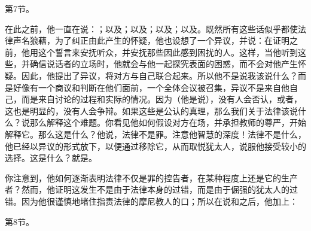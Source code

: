 第7节。\par

在此之前，他一直在说：；以及；以及；以及；以及。既然所有这些话似乎都使法律声名狼藉，为了纠正由此产生的怀疑，他也设想了一个异议，并说：在证明之前，他用这个誓言来安抚听众，并安抚那些因此感到困扰的人。这样，当他听到这些，并确信说话者的立场时，他就会与他一起探究表面的困惑，而不会对他产生怀疑。因此，他提出了异议，将对方与自己联合起来。所以他不是说我该说什么？而是好像有一个商议和判断在他们面前，一个全体会议被召集，异议不是来自他自己，而是来自讨论的过程和实际的情况。因为（他是说），没有人会否认，或者，这也是明显的，没有人会争辩。如果这些是公认的真理，那么我们关于法律该说什么？说那么解释这个难题。你看见他如何假设对方在场，并承担教师的尊严，开始解释它。那么这是什么？他说，法律不是罪。注意他智慧的深度！法律不是什么，他已经以异议的形式放下，以便通过移除它，从而取悦犹太人，说服他接受较小的选择。这是什么？就是。\par

你注意到，他如何逐渐表明法律不仅是罪的控告者，在某种程度上还是它的生产者？然而，他证明这发生不是由于法律本身的过错，而是由于倔强的犹太人的过错。因为他很谨慎地堵住指责法律的摩尼教人的口；所以在说和之后，他加上：\par

第8节。\par


